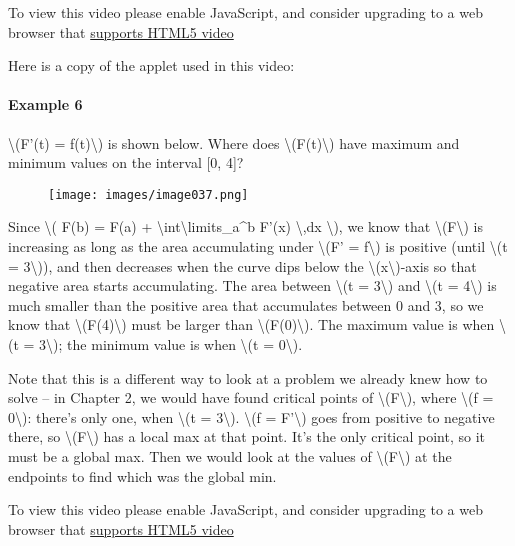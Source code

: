 To view this video please enable JavaScript, and consider upgrading to a
web browser that \href{http://videojs.com/html5-video-support/}{supports
HTML5 video}

Here is a copy of the applet used in this video:

\hypertarget{example-6}{%
\paragraph{Example 6}\label{example-6}}

\textbackslash{}(F'(t) = f(t)\textbackslash{}) is shown below. Where
does \textbackslash{}(F(t)\textbackslash{}) have maximum and minimum
values on the interval {[}0, 4{]}?

\begin{figure}
\centering
\texttt{[image: images/image037.png]}
\caption{}
\end{figure}

Since \textbackslash{}( F(b) = F(a) +
\textbackslash{}int\textbackslash{}limits\_a\^{}b F'(x)
\textbackslash{},dx \textbackslash{}), we know that
\textbackslash{}(F\textbackslash{}) is increasing as long as the area
accumulating under \textbackslash{}(F' = f\textbackslash{}) is positive
(until \textbackslash{}(t = 3\textbackslash{})), and then decreases when
the curve dips below the \textbackslash{}(x\textbackslash{})-axis so
that negative area starts accumulating. The area between
\textbackslash{}(t = 3\textbackslash{}) and \textbackslash{}(t =
4\textbackslash{}) is much smaller than the positive area that
accumulates between 0 and 3, so we know that
\textbackslash{}(F(4)\textbackslash{}) must be larger than
\textbackslash{}(F(0)\textbackslash{}). The maximum value is when
\textbackslash{}(t = 3\textbackslash{}); the minimum value is when
\textbackslash{}(t = 0\textbackslash{}).

Note that this is a different way to look at a problem we already knew
how to solve -- in Chapter 2, we would have found critical points of
\textbackslash{}(F\textbackslash{}), where \textbackslash{}(f =
0\textbackslash{}): there's only one, when \textbackslash{}(t =
3\textbackslash{}). \textbackslash{}(f = F'\textbackslash{}) goes from
positive to negative there, so \textbackslash{}(F\textbackslash{}) has a
local max at that point. It's the only critical point, so it must be a
global max. Then we would look at the values of
\textbackslash{}(F\textbackslash{}) at the endpoints to find which was
the global min.

To view this video please enable JavaScript, and consider upgrading to a
web browser that \href{http://videojs.com/html5-video-support/}{supports
HTML5 video}

